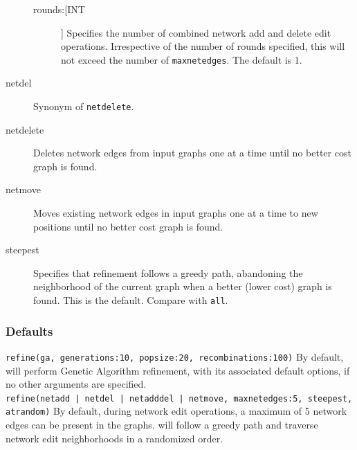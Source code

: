 \begin{description}
		\begin{description}
			\item[rounds:[INT]]  Specifies the number of combined network add and delete
			edit operations. Irrespective of the number of rounds specified, this will not
			exceed the number of \texttt{maxnetedges}. The default is 1.
		\end{description}
			
		\item[netdel] Synonym of \texttt{netdelete}.
			
		\item[netdelete] Deletes network edges from input graphs one at a time until no better 
		cost 	graph is found.
		
		\item[netmove] Moves existing network edges in input graphs one at a time to new 
		positions until no better cost graph is found.
		
		
		\item[steepest] Specifies that refinement follows a greedy path, abandoning the 
		neighborhood of the current graph when a better (lower cost) graph is found. 
		This is the default. Compare with \texttt{all}.
		
	\end{description}

	\subsubsection{Defaults}
		\texttt{refine(ga, generations:10, popsize:20, recombinations:100)} By 
		default, \phyg will perform Genetic Algorithm refinement, with its associated
		  default options, if no other arguments are specified.\\
		   
		\noindent \texttt{refine(netadd | netdel | netadddel | netmove, maxnetedges:5, 
		   steepest, atrandom)} By default, during network edit operations, a maximum of
		5 network edges can be present in the graphs. \phyg will follow a greedy path and 
		   traverse network edit neighborhoods in a randomized order.
	
